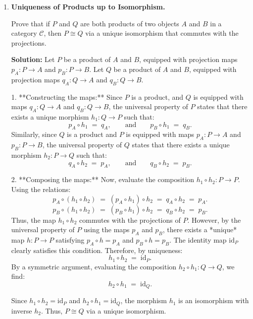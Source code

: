 \documentclass[12pt, a4paper]{article}
\begin{document}
\begin{enumerate}[label=\textbf{E\arabic*.}]
  \item \textbf{Uniqueness of Products up to Isomorphism.}
  
        Prove that if $P$ and $Q$ are both products of two objects $A$ and $B$ in a category $\mathcal{C}$, then $P \cong Q$ via a unique isomorphism that commutes with the projections.
        
        \textbf{Solution:}
        Let $P$ be a product of $A$ and $B$, equipped with projection maps $p_A: P \to A$ and $p_B: P \to B$.
        Let $Q$ be a product of $A$ and $B$, equipped with projection maps $q_A: Q \to A$ and $q_B: Q \to B$.
        
        1. **Constructing the maps:**
           Since $P$ is a product, and $Q$ is equipped with maps $q_A: Q \to A$ and $q_B: Q \to B$, the universal property of $P$ states that there exists a unique morphism $h_1: Q \to P$ such that:
           \[
             p_A \circ h_1 \;=\; q_A, \qquad \text{and} \qquad p_B \circ h_1 \;=\; q_B.
           \]
           Similarly, since $Q$ is a product and $P$ is equipped with maps $p_A: P \to A$ and $p_B: P \to B$, the universal property of $Q$ states that there exists a unique morphism $h_2: P \to Q$ such that:
           \[
             q_A \circ h_2 \;=\; p_A, \qquad \text{and} \qquad q_B \circ h_2 \;=\; p_B.
           \]
        
        2. **Composing the maps:**
           Now, evaluate the composition $h_1 \circ h_2: P \to P$.
           Using the relations:
           \[
             p_A \circ (h_1 \circ h_2) \;=\; (p_A \circ h_1) \circ h_2 \;=\; q_A \circ h_2 \;=\; p_A.
           \]
           \[
             p_B \circ (h_1 \circ h_2) \;=\; (p_B \circ h_1) \circ h_2 \;=\; q_B \circ h_2 \;=\; p_B.
           \]
           Thus, the map $h_1 \circ h_2$ commutes with the projections of $P$.
           However, by the universal property of $P$ using the maps $p_A$ and $p_B$, there exists a *unique* map $h: P \to P$ satisfying $p_A \circ h = p_A$ and $p_B \circ h = p_B$.
           The identity map $\text{id}_P$ clearly satisfies this condition.
           Therefore, by uniqueness:
           \[
             h_1 \circ h_2 \;=\; \text{id}_P.
           \]
           By a symmetric argument, evaluating the composition $h_2 \circ h_1: Q \to Q$, we find:
           \[
             h_2 \circ h_1 \;=\; \text{id}_Q.
           \]
           
        Since $h_1 \circ h_2 = \text{id}_P$ and $h_2 \circ h_1 = \text{id}_Q$, the morphism $h_1$ is an isomorphism with inverse $h_2$.
        Thus, $P \cong Q$ via a unique isomorphism.
        

\end{enumerate}
\end{document}
